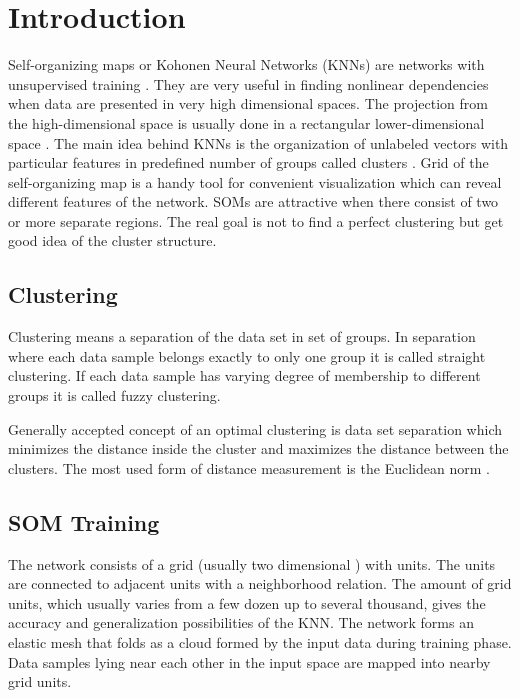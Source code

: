 \documentclass[runningheads]{llncs}
\begin{document}
\section{Introduction}

Self-organizing maps or Kohonen Neural Networks (KNNs) are networks with unsupervised training \cite{schreck01}. They are very useful in finding nonlinear dependencies when data are presented in very high dimensional spaces. The projection from the high-dimensional space is usually done in a rectangular lower-dimensional space \cite{macq01}. The main idea behind KNNs is the organization of unlabeled vectors with particular features in predefined number of groups called clusters \cite{cottrell01}. Grid of the self-organizing map is a handy tool for convenient visualization which can reveal different features of the network. SOMs are attractive when there consist of two or more separate regions. The real goal is not to find a perfect clustering but get good idea of the cluster structure. 

\subsection{Clustering}

Clustering means a separation of the data set in set of groups. In separation where each data sample belongs exactly to only one group it is called straight clustering. If each data sample has varying degree of membership to different groups it is called fuzzy clustering.

Generally accepted concept of an optimal clustering is data set separation which minimizes the distance inside the cluster and maximizes the distance between the clusters. The most used form of distance measurement is the Euclidean norm \cite{lozano01}. 

\subsection{SOM Training}

The network consists of a grid (usually two dimensional \cite{wehrens01}) with units. The units are connected to adjacent units with a neighborhood relation. The amount of grid units, which usually varies from a few dozen up to several thousand, gives the accuracy and generalization possibilities of the KNN. The network forms an elastic mesh that folds as a cloud formed by the input data during training phase. Data samples lying near each other in the input space are mapped into nearby grid units. 
\end{document}
